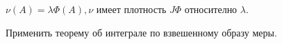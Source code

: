\documentclass[paper=a4, fontsize=17pt]{article}
\begin{document}
$\nu(A) = \lambda \Phi (A), \nu$ имеет плотность $J \Phi$ относително $\lambda$.

Применить теорему об интеграле по взвешенному образу меры.


\end{document}
